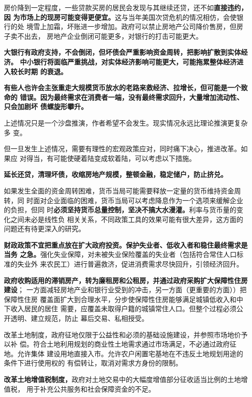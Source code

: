 房价降到一定程度，一些贷款买房的居民会发现与其继续还贷，还不如\textbf{直接违约，因
  为市场上的现房可能变得更便宜。}这与当年美国次贷危机的情况相仿，会使银行的处
境雪上加霜，坏账进一步增加。政府可以禁止房地产公司降价售房，但房子卖不出去，
房地产企业倒闭可能更多，对银行的打击可能更大。

\textbf{大银行有政府支持，不会倒闭，但坏债会严重影响资金周转，把影响扩散到实体经济。
中小银行将面临严重挑战，对实体经济影响可能更大，可能拖累整体经济进入较长时期
的衰退。}

\textbf{有些人也许会主张重走大规模货币放水的老路来救经济、拉增长，但可能是一个致命的
错误。因为最终需求在消费者一端，没有最终需求回升，大量增加流动性、只会加剧坏
债螺旋形攀升。}

上述情况只是一个沙盘推演，作者希望不会发生。现实情况永远比理论推演更复杂多
变。

但一旦发生上述情况，需要有理性的宏观政策应对，同时痛下决心，推进改革。如果应
对得当，有可能使硬着陆变成软着陆，可以考虑以下措施。

\textbf{延长还贷，清理坏债，收缩房地产规模，整顿金融，稳定储户，防止挤兑。}

如果发生全面的资金周转困难，货币当局可能需要释放一定量的货币维持资金周转，同
时面对企业面临的困难，货币当局可以考虑降息作为一个选项来缓解企业的负担，但同
时\textbf{必须坚持货币总量控制，坚决不搞大水漫灌。}利率与货币量的变化之间未必是线性负
相关关系，不同政策工具的效果可能有很大差异，这方面的问题还有待更深入的研究。

\textbf{财政政策不宜把重点放在扩大政府投资。保护失业者、低收入者和稳住最终需求是当务
之急。}强化失业保障，对未被失业保险覆盖的失业者（包括符合常住人口标准的失业外
来农民工）进行普遍救济，促进消费需求尽快回升，引领经济回升。

\textbf{政府收购适用的滞销房产，转为廉租房和公租房，并通过政府采购扩大保障性住房建设}；
一方面减轻房地产业和银行业受到的冲击，另一方面（更重要的方面））把保障性住房
覆盖面扩大到合理水平，分步使保障性住房能够满足城镇低收入和中下收入居民的居住
需要，应覆盖未取得户籍的城镇常住人口。但整个过程必须公开透明、建立规范，防止
幕后交易、私相授受。

改革土地制度，政府征地仅限于公益性和必须的基础设施建设，并参照市场地价予以补
偿。符合土地利用规划的商业性土地需求通过市场满足，不必通过政府征地。允许集体
建设用地直接入市。允许农户闲置宅基地在不违反土地规划用途的条件下进行使用权的
有偿转让，取消对需求方身份的限制。

\textbf{改革土地增值税制度，}政府对土地交易中的大幅度增值部分征收适当比例的土地增值税，
用于补充公共服务和社会保障资金的不足。

